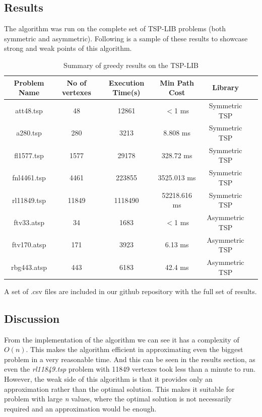 \documentclass[11pt, english]{article}
\begin{document}
\subsection{Results}
\begin{table}[!h]
	The algorithm was run on the complete set of TSP-LIB problems (both symmetric and asymmetric). Following is a sample of these results to showcase strong and weak points of this algorithm.
	\bigskip
	
	\centering
	\begin{tabular}{|c|c|c|c|c|c|}
		\hline
		Problem Name & No of vertexes  & Execution Time(s) & Min Path Cost &  Library  \\
		\hline\hline
		att48.tsp & 48 & 12861 & $<$1 ms & Symmetric TSP\\
		\hline
		a280.tsp & 280 & 3213 & 8.808 ms & Symmetric TSP\\
		\hline
		fl1577.tsp & 1577 & 29178 & 328.72 ms & Symmetric TSP\\
		\hline
		fnl4461.tsp & 4461 & 223855 & 3525.013 ms & Symmetric TSP\\
		\hline
		rl11849.tsp & 11849 & 1118490 & 52218.616 ms & Symmetric TSP\\
		\hline\hline
		ftv33.atsp & 34 & 1683 & $<$1 ms & Asymmetric TSP\\
		\hline
		ftv170.atsp & 171 & 3923 & 6.13 ms & Asymmetric TSP\\
		\hline
		rbg443.atsp & 443 & 6183 & 42.4 ms & Asymmetric TSP\\
		\hline
		\hline
	\end{tabular}
	\begin{tablenotes}
		\small
		\item A set of .csv files are included in our github repository with the full set of results.
	\end{tablenotes}
	\caption{Summary of greedy results on the TSP-LIB}
	\label{greedy_table}
\end{table}

\subsection{Discussion}
From the implementation of the algorithm we can see it has a complexity of $O(n)$. This makes the algorithm efficient in approximating even the biggest problem in a very reasonable time. And this can be seen in the results section, as even the \textit{rl11849.tsp} problem with 11849 vertexes took less than a minute to run.\\
However, the weak side of this algorithm is that it provides only an approximation rather than the optimal solution. This makes it suitable for problem with large \textit{n} values, where the optimal solution is not necessarily required and an approximation would be enough.
\end{document}
